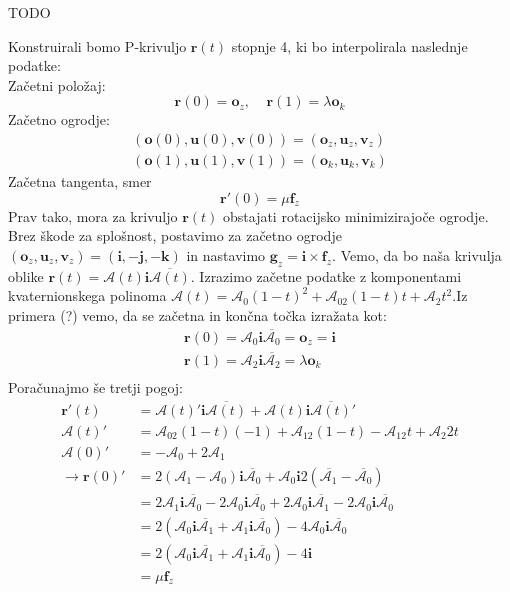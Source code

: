 \documentclass[mat1]{fmfdelo}
\newcommand{\rr}{\boldsymbol r}
\newcommand{\ii}{\boldsymbol i}
\newcommand{\jj}{\boldsymbol j}
\newcommand{\kk}{\boldsymbol k}
\newcommand{\oo}{\boldsymbol o}
\newcommand{\uu}{\boldsymbol u}
\newcommand{\vv}{\boldsymbol v}
\newcommand{\A}{\mathcal A}
\newcommand{\ff}{\boldsymbol f}
\newcommand{\g}{\boldsymbol g}
\begin{document}
\begin{dokaz}
	TODO
\end{dokaz}

Konstruirali bomo P-krivuljo $\rr(t)$ stopnje 4, ki bo interpolirala naslednje podatke:\\
Začetni položaj:
\begin{equation}
	\rr(0) = \oo_z, ~~~~~ \rr(1) = \lambda \oo_k
\end{equation}
Začetno ogrodje:
\begin{equation}
\begin{split}
	(\oo(0),\uu(0), \vv(0)) = (\oo_z, \uu_z, \vv_z)\\
(\oo(1),\uu(1), \vv(1)) = (\oo_k, \uu_k, \vv_k)
\end{split}
\end{equation}
Začetna tangenta, smer
\begin{equation}
	\rr '(0) = \mu \ff_z
\end{equation}
Prav tako, mora za krivuljo $\rr(t)$ obstajati rotacijsko minimizirajoče ogrodje.\\
Brez škode za splošnost, postavimo za začetno ogrodje $(\oo_z, \uu_z, \vv_z) = (\ii, - \jj, -\kk)$ in nastavimo $\g_z = \ii \times \ff_z$. Vemo, da bo naša krivulja oblike $\rr(t) = \A(t) \ii \overline{\A(t)}$. Izrazimo začetne podatke z komponentami kvaternionskega polinoma $\A(t) = \A_0(1-t)^2 + \A_02(1-t)t + \A_2t^2$.Iz primera (?) vemo, da se začetna in končna točka izražata kot:
\begin{equation}
	\begin{split}
	\rr(0) = \A_0 \ii\overline{\A_0} = \oo_z = \ii \\
		\rr(1) = \A_2 \ii\overline{\A_2} = \lambda \oo_k \\
	\end{split}
\end{equation}
Poračunajmo še tretji pogoj:
\begin{equation*}
\begin{split}
	\rr'(t) &= \A(t)' \ii \overline{\A(t)} + \A(t) \ii \overline{\A(t)}' \\
	\A(t)' &= \A_02(1-t)(-1) + \A_12(1-t) - \A_12t + \A_2 2t \\
	\A(0)' &= -\A_0 + 2 \A_1 \\
	\rightarrow \rr(0)' &= 2(\A_1-\A_0)\ii \overline{\A_0} + \A_0 \ii 2(\overline{\A_1} - \overline{\A_0}) \\
	&= 2\A_1 \ii \overline{\A_0} - 2 \A_0 \ii \overline{\A_0} + 2 \A_0 \ii \overline{\A_1}-2\A_0 \ii \overline{\A_0} \\
	&= 2(\A_0 \ii \overline{\A_1} + \A_1 \ii \overline{\A_0}) - 4 \A_0 \ii \overline{\A_0} \\
	&= 2(\A_0 \ii \overline{\A_1} + \A_1 \ii \overline{\A_0}) - 4 \ii \\
	&= \mu \ff_z
\end{split}
\end{equation*}
\end{document}
